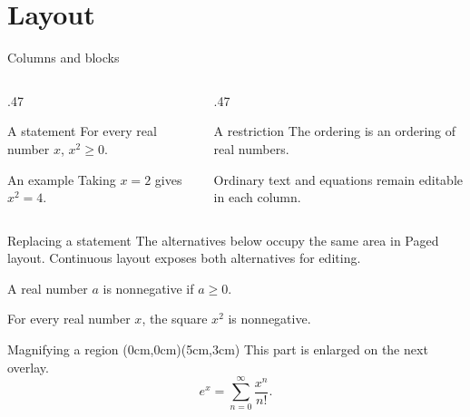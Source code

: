 \documentclass[aspectratio=169]{beamer}
\begin{document}
\section{Layout}
\begin{frame}[t]{Columns and blocks}
\begin{columns}[T,onlytextwidth]
\begin{column}{.47\textwidth}
\begin{block}{A statement}
For every real number $x$, $x^2\geq0$.
\end{block}
\begin{exampleblock}{An example}
Taking $x=2$ gives $x^2=4$.
\end{exampleblock}
\end{column}
\begin{column}{.47\textwidth}
\begin{alertblock}{A restriction}
The ordering is an ordering of real numbers.
\end{alertblock}
Ordinary text and equations remain editable in each column.
\end{column}
\end{columns}
\end{frame}

\begin{frame}[t]{Replacing a statement}
The alternatives below occupy the same area in Paged layout.
Continuous layout exposes both alternatives for editing.
\begin{overprint}
\begin{definition}[Nonnegative]
A real number $a$ is nonnegative if $a\geq0$.
\end{definition}
\begin{theorem}[Squares]
For every real number $x$, the square $x^2$ is nonnegative.
\end{theorem}
\end{overprint}
\end{frame}

\begin{frame}[t]{Magnifying a region}
(0cm,0cm)(5cm,3cm)
This part is enlarged on the next overlay.
\[
  e^x=\sum_{n=0}^{\infty}\frac{x^n}{n!}.
\]
\end{frame}

\end{document}
